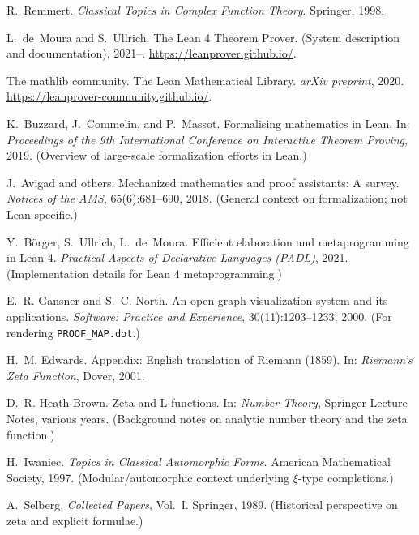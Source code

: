 \documentclass[11pt]{article}
\theoremstyle{plain}
\theoremstyle{definition}
\begin{document}
\begin{thebibliography}{99}
R.~Remmert.
\newblock \emph{Classical Topics in Complex Function Theory}.
\newblock Springer, 1998.

L.~de~Moura and S.~Ullrich.
\newblock The Lean 4 Theorem Prover.
\newblock (System description and documentation), 2021--.
\newblock \url{https://leanprover.github.io/}.

The mathlib community.
\newblock The Lean Mathematical Library.
\newblock \emph{arXiv preprint}, 2020.
\newblock \url{https://leanprover-community.github.io/}.

K.~Buzzard, J.~Commelin, and P.~Massot.
\newblock Formalising mathematics in Lean.
\newblock In: \emph{Proceedings of the 9th International Conference on Interactive Theorem Proving}, 2019.
\newblock (Overview of large-scale formalization efforts in Lean.)

J.~Avigad and others.
\newblock Mechanized mathematics and proof assistants: A survey.
\newblock \emph{Notices of the AMS}, 65(6):681--690, 2018.
\newblock (General context on formalization; not Lean-specific.)

Y.~B{\"o}rger, S.~Ullrich, L.~de~Moura.
\newblock Efficient elaboration and metaprogramming in Lean 4.
\newblock \emph{Practical Aspects of Declarative Languages (PADL)}, 2021.
\newblock (Implementation details for Lean 4 metaprogramming.)

E.~R. Gansner and S.~C. North.
\newblock An open graph visualization system and its applications.
\newblock \emph{Software: Practice and Experience}, 30(11):1203--1233, 2000.
\newblock (For rendering \texttt{PROOF\_MAP.dot}.)

H.~M. Edwards.
\newblock Appendix: English translation of Riemann (1859).
\newblock In: \emph{Riemann's Zeta Function}, Dover, 2001.

D.~R. Heath-Brown.
\newblock Zeta and L-functions.
\newblock In: \emph{Number Theory}, Springer Lecture Notes, various years.
\newblock (Background notes on analytic number theory and the zeta function.)

H.~Iwaniec.
\newblock \emph{Topics in Classical Automorphic Forms}.
\newblock American Mathematical Society, 1997.
\newblock (Modular/automorphic context underlying \(\xi\)-type completions.)

A.~Selberg.
\newblock \emph{Collected Papers}, Vol.~I.
\newblock Springer, 1989.
\newblock (Historical perspective on zeta and explicit formulae.)


\end{thebibliography}
\end{document}
